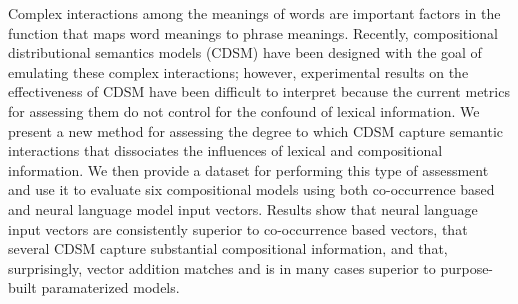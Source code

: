 Complex interactions among the meanings of words are important factors in the function that maps word  meanings to phrase meanings. Recently, compositional distributional semantics models (CDSM) have been designed with the goal of emulating these complex interactions; however, experimental results on the effectiveness of CDSM have been difficult to interpret because the current metrics for assessing them do not control for the confound of lexical information. We present a new method for assessing the degree to which CDSM capture semantic interactions that dissociates the influences of lexical and compositional information. We then provide a dataset for performing this type of assessment and use it to evaluate six compositional   models using both co-occurrence based and neural language model input vectors. Results show that neural language input vectors are consistently superior to co-occurrence based vectors, that several CDSM capture substantial compositional information, and that, surprisingly, vector addition matches and is in many cases superior to purpose-built paramaterized models.
